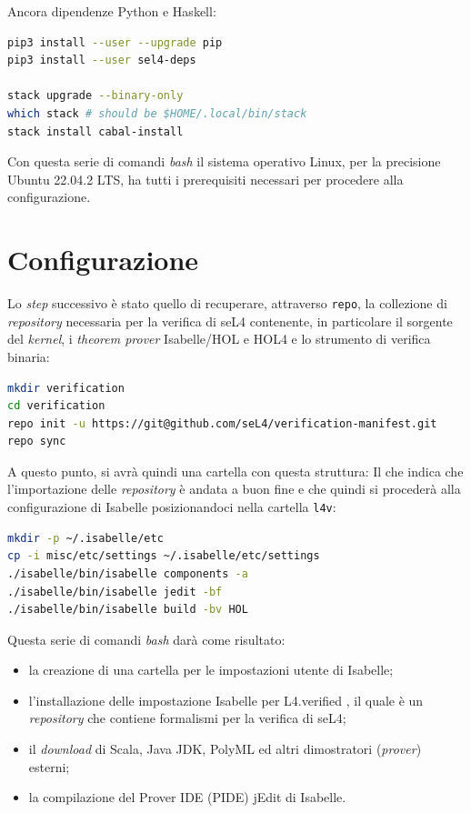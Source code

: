 Ancora dipendenze Python e Haskell:
\begin{lstlisting}[language=bash]
pip3 install --user --upgrade pip
pip3 install --user sel4-deps

stack upgrade --binary-only
which stack # should be $HOME/.local/bin/stack
stack install cabal-install
\end{lstlisting}

Con questa serie di comandi \textit{bash} il sistema operativo Linux, per la precisione Ubuntu 22.04.2 LTS, ha tutti i prerequisiti necessari per procedere alla configurazione.

\section{Configurazione}
Lo \textit{step} successivo è stato quello di recuperare, attraverso \texttt{repo}, la collezione di \textit{repository} necessaria per la verifica di seL4 contenente, in particolare il sorgente del \textit{kernel}, i \textit{theorem prover} Isabelle/HOL e HOL4 e lo strumento di verifica binaria:
\begin{lstlisting}[language=bash]
mkdir verification
cd verification
repo init -u https://git@github.com/seL4/verification-manifest.git
repo sync
\end{lstlisting}

A questo punto, si avrà quindi una cartella con questa struttura:
Il che indica che l'importazione delle \textit{repository} è andata a buon fine e che quindi si procederà alla configurazione di Isabelle posizionandoci nella cartella \texttt{l4v}:
\begin{lstlisting}[language=bash]
mkdir -p ~/.isabelle/etc
cp -i misc/etc/settings ~/.isabelle/etc/settings
./isabelle/bin/isabelle components -a
./isabelle/bin/isabelle jedit -bf
./isabelle/bin/isabelle build -bv HOL
\end{lstlisting}

Questa serie di comandi \textit{bash} darà come risultato:
\begin{itemize}
	\item la creazione di una cartella per le impostazioni utente di Isabelle;
	\item l'installazione delle impostazione Isabelle per L4.verified \cite{l4v}, il quale è un \textit{repository} che contiene formalismi per la verifica di seL4;
	\item il \textit{download} di Scala, Java JDK, PolyML ed altri dimostratori (\textit{prover}) esterni;
	\item la compilazione del Prover IDE (PIDE) jEdit di Isabelle.
\end{itemize} 

